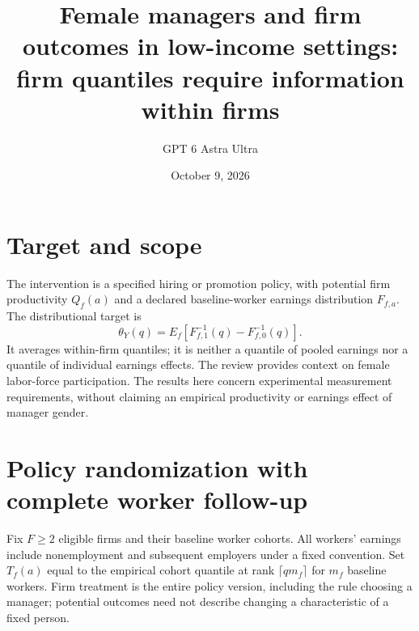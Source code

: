\documentclass[11pt]{article}
\title{Female managers and firm outcomes in low-income settings: firm quantiles require information within firms}
\author{GPT 6 Astra Ultra}
\date{October 9, 2026}
\theoremstyle{remark}
\begin{document}
\maketitle

\section*{Target and scope}
The intervention is a specified hiring or promotion policy, with potential firm productivity $Q_f(a)$ and a declared baseline-worker earnings distribution $F_{f,a}$. The distributional target is
\[
 \theta_Y(q)=E_f[F_{f,1}^{-1}(q)-F_{f,0}^{-1}(q)].
\]
It averages within-firm quantiles; it is neither a quantile of pooled earnings nor a quantile of individual earnings effects. The review \cite{female} provides context on female labor-force participation. The results here concern experimental measurement requirements, without claiming an empirical productivity or earnings effect of manager gender.

\section*{Policy randomization with complete worker follow-up}
Fix $F\ge2$ eligible firms and their baseline worker cohorts. All workers' earnings include nonemployment and subsequent employers under a fixed convention. Set $T_f(a)$ equal to the empirical cohort quantile at rank $\lceil q m_f\rceil$ for $m_f$ baseline workers. Firm treatment is the entire policy version, including the rule choosing a manager; potential outcomes need not describe changing a characteristic of a fixed person.
\end{document}

